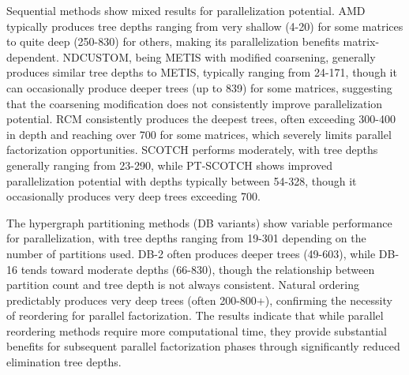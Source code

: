 Sequential methods show mixed results for parallelization potential. AMD typically produces tree depths ranging from very shallow (4-20) for some matrices to quite deep (250-830) for others, making its parallelization benefits matrix-dependent. NDCUSTOM, being METIS with modified coarsening, generally produces similar tree depths to METIS, typically ranging from 24-171, though it can occasionally produce deeper trees (up to 839) for some matrices, suggesting that the coarsening modification does not consistently improve parallelization potential. RCM consistently produces the deepest trees, often exceeding 300-400 in depth and reaching over 700 for some matrices, which severely limits parallel factorization opportunities. SCOTCH performs moderately, with tree depths generally ranging from 23-290, while PT-SCOTCH shows improved parallelization potential with depths typically between 54-328, though it occasionally produces very deep trees exceeding 700.

The hypergraph partitioning methods (DB variants) show variable performance for parallelization, with tree depths ranging from 19-301 depending on the number of partitions used. DB-2 often produces deeper trees (49-603), while DB-16 tends toward moderate depths (66-830), though the relationship between partition count and tree depth is not always consistent. Natural ordering predictably produces very deep trees (often 200-800+), confirming the necessity of reordering for parallel factorization. The results indicate that while parallel reordering methods require more computational time, they provide substantial benefits for subsequent parallel factorization phases through significantly reduced elimination tree depths.

